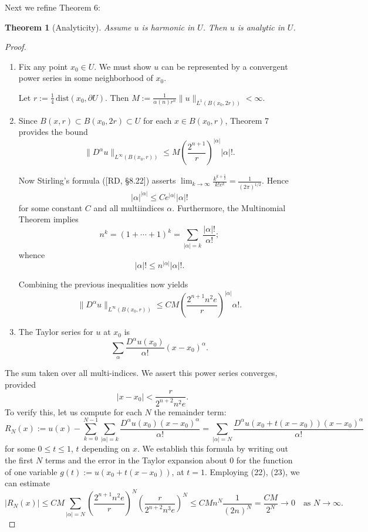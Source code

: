 \documentclass[a4paper,12pt]{report}
\newtheorem{theorem}{Theorem}[section]
\begin{document}
Next we refine Theorem 6:
\begin{theorem}[Analyticity]
Assume $u$ is harmonic in $U$. Then $u$ is analytic in $U$.
\end{theorem}
\begin{proof}
\begin{enumerate}
    \item Fix any point $x_0 \in U$. We must show $u$ can be represented by a convergent power series in some neighborhood of $x_0$.
    
    Let $r := \frac{1}{4} \, \text{dist}(x_0, \partial U)$. Then $M := \frac{1}{\alpha(n) r^n} \|u\|_{L^1(B(x_0, 2r))} < \infty$.
    
    \item Since $B(x, r) \subset B(x_0, 2r) \subset U$ for each $x \in B(x_0, r)$, Theorem 7 provides the bound
    \[
    \|D^\alpha u\|_{L^\infty(B(x_0, r))} \leq M \left( \frac{2^{n+1}}{r} \right)^{|\alpha|} |\alpha|!.
    \]
    
    Now Stirling's formula ([RD, §8.22]) asserts $\lim_{k \to \infty} \frac{k^{k + \frac{1}{2}}}{k! e^k} = \frac{1}{(2\pi)^{1/2}}$. Hence
    \[
    |\alpha|^{|\alpha|} \leq C e^{|\alpha|} |\alpha|!
    \]
    for some constant $C$ and all multiindices $\alpha$. Furthermore, the Multinomial Theorem implies
    \[
    n^k = (1 + \cdots + 1)^k = \sum_{|\alpha| = k} \frac{|\alpha|!}{\alpha!};
    \]
    whence
    \[
    |\alpha|! \leq n^{|\alpha|} |\alpha|!.
    \]
    
    Combining the previous inequalities now yields
    \[
    \|D^\alpha u\|_{L^\infty(B(x_0, r))} \leq C M \left( \frac{2^{n+1} n^2 e}{r} \right)^{|\alpha|} \alpha!.
    \]
    
    \item The Taylor series for $u$ at $x_0$ is
    \[
    \sum_\alpha \frac{D^\alpha u(x_0)}{\alpha!} (x - x_0)^\alpha.
    \]
\end{enumerate}
The sum taken over all multi-indices. We assert this power series converges, provided
\[
|x - x_0| < \frac{r}{2^{n + 2} n^2 e}. \tag{23}
\]
To verify this, let us compute for each \( N \) the remainder term:
\[
R_N(x) := u(x) - \sum_{k=0}^{N-1} \sum_{|\alpha| = k} \frac{D^{\alpha} u(x_0)(x - x_0)^{\alpha}}{\alpha!} 
= \sum_{|\alpha| = N} \frac{D^{\alpha} u(x_0 + t(x - x_0))(x - x_0)^{\alpha}}{\alpha!}
\]
for some \( 0 \leq t \leq 1 \), \( t \) depending on \( x \). We establish this formula by writing out the first \( N \) terms and the error in the Taylor expansion about 0 for the function of one variable \( g(t) := u(x_0 + t(x - x_0)) \), at \( t = 1 \). Employing (22), (23), we can estimate
\[
|R_N(x)| \leq CM \sum_{|\alpha| = N} \left( \frac{2^{n+1} n^2 e}{r} \right)^N \left( \frac{r}{2^{n + 2} n^3 e} \right)^N \leq CM n^N \frac{1}{(2n)^N} = \frac{CM}{2^N} \to 0 \quad \text{as } N \to \infty.
\]
\end{proof}
\end{document}
